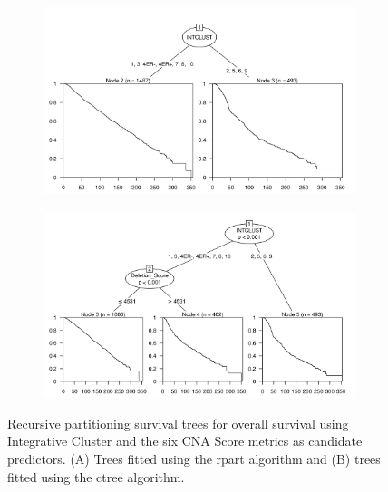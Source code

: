 \begin{figure}[!htb]
\centering

\vspace{0.5cm}

\begin{subfigure}{\textwidth}
\subcaption{}
\includegraphics[width=1\textwidth]{../figures/Appendices/Appendix_B/PartyKit_Survival_Score_OS_INTCLUST.png}
\end{subfigure}

\vspace{2cm}

\begin{subfigure}{\textwidth}
\subcaption{}
\includegraphics[width=1\textwidth]{../figures/Appendices/Appendix_B/Ctree_Survival_Score_OS_INTCLUST.png}
\end{subfigure}

\vspace{0.5cm}

\caption[Recursive partitioning survival trees for overall survival using Integrative Cluster and the six CNA Score metrics as candidate predictors.]{Recursive partitioning survival trees for overall survival using Integrative Cluster and the six CNA Score metrics as candidate predictors. (A) Trees fitted using the rpart algorithm and (B) trees fitted using the ctree algorithm.}
\end{figure}

